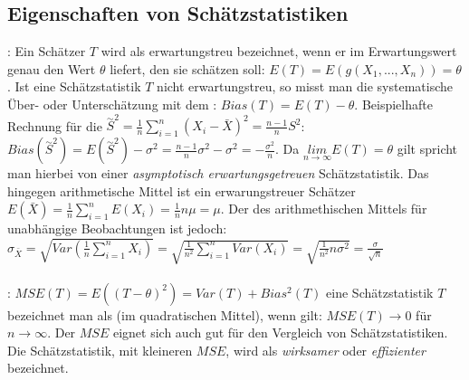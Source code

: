 \subsection{Eigenschaften von Schätzstatistiken}
: Ein Schätzer $T$ wird als erwartungstreu bezeichnet, 
wenn er im Erwartungswert genau den Wert $\theta$ liefert, den sie schätzen soll: $E(T) = E(g(X_1, ..., X_n)) = \theta$. Ist eine Schätzstatistik $T$ nicht erwartungstreu, 
so misst man die systematische Über- oder Unterschätzung mit dem : 
$Bias(T) = E(T) - \theta$. Beispielhafte Rechnung für die  
$\overset{\sim}{S}^2 = \frac{1}{n} \sum_{i=1}^{n}(X_i - \bar{X})^2 = \frac{n - 1}{n}S^2$: 
$Bias(\overset{\sim}{S}^2) = E(\overset{\sim}{S}^2) - \sigma^2 = \frac{n - 1}{n}\sigma^2 - \sigma^2 = - \frac{\sigma^2}{n}$. 
Da $\underset{n \rightarrow \infty}{lim} E(T) = \theta$ gilt spricht man hierbei von einer \emph{asymptotisch erwartungsgetreuen} Schätzstatistik. 
Das hingegen arithmetische Mittel ist ein erwarungstreuer Schätzer 
$E(\bar{X}) = \frac{1}{n}\sum_{i=1}^{n}E(X_i)=\frac{1}{n}n\mu = \mu$. 
Der  des arithmethischen Mittels für unabhängige Beobachtungen ist jedoch: 
$\sigma_{\bar{X}} = \sqrt{Var(\frac{1}{n} \sum_{i=1}^{n}X_i)} = \sqrt{\frac{1}{n^2}\sum_{i=1}^nVar(X_i)} = \sqrt{\frac{1}{n^2}n\sigma^2} = \frac{\sigma}{\sqrt{n}}$\\\\
: $MSE(T) = E((T - \theta)^2) = Var(T) + Bias^2(T)$ eine Schätzstatistik $T$
bezeichnet man als  (im quadratischen Mittel), wenn gilt: $MSE(T) \rightarrow 0$ für $n \rightarrow \infty$.
Der $MSE$ eignet sich auch gut für den Vergleich von Schätzstatistiken. Die Schätzstatistik, mit kleineren $MSE$,
wird als \emph{wirksamer} oder \emph{effizienter} bezeichnet. 
